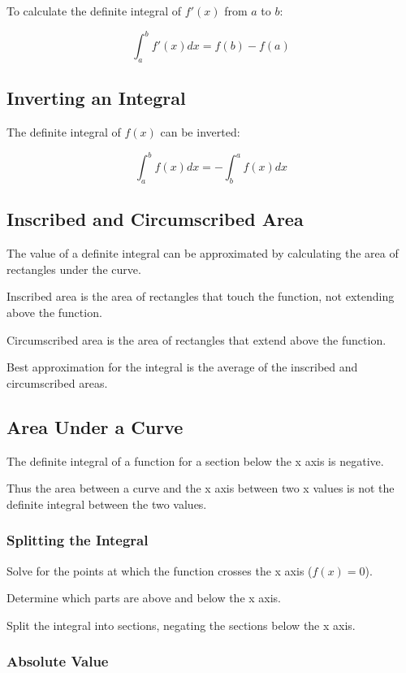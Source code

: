 \documentclass[a4paper,11pt]{article}
\begin{document}
To calculate the definite integral of $f'(x)$ from $a$ to $b$:

$$
\int_a^b f'(x) dx = f(b) - f(a)
$$


\subsection{Inverting an Integral}

The definite integral of $f(x)$ can be inverted:

$$
\int_a^b f(x) dx = -\int_b^a f(x) dx
$$


\subsection{Inscribed and Circumscribed Area}

The value of a definite integral can be approximated by calculating the area of
rectangles under the curve.

Inscribed area is the area of rectangles that touch the function, not extending
above the function.

Circumscribed area is the area of rectangles that extend above the function.

Best approximation for the integral is the average of the inscribed and
circumscribed areas.


\subsection{Area Under a Curve}

The definite integral of a function for a section below the x axis is negative.

Thus the area between a curve and the x axis between two x values is not the
definite integral between the two values.


\subsubsection{Splitting the Integral}

Solve for the points at which the function crosses the x axis ($f(x) = 0$).

Determine which parts are above and below the x axis.

Split the integral into sections, negating the sections below the x axis.


\subsubsection{Absolute Value}
\end{document}
